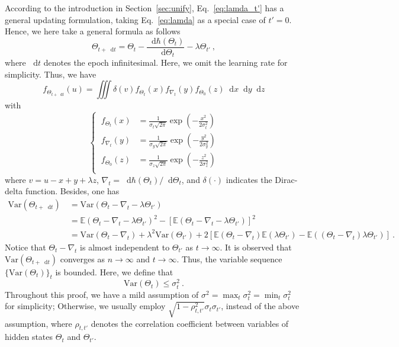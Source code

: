 \documentclass[review,10pt]{JMtemplate}
\newcommand*{\dif}{\mathop{}\!\mathrm{d}}
\begin{document}
According to the introduction in Section~\ref{sec:unify}, Eq.~\eqref{eq:lamda_t'} has a general updating formulation, taking Eq.~\eqref{eq:lamda} as a special case of $t'=0$. Hence, we here take a general formula as follows
\[
\Theta_{t+ \dif t} = \Theta_t  -  \frac{\dif \hbar(\Theta_t)}{\dif \Theta_t}  - \lambda \Theta_{t'} \ ,
\]
where $\dif t$ denotes the epoch infinitesimal. Here, we omit the learning rate for simplicity. Thus, we have
\[
f_{\Theta_{t+\dif t}}( u )  = \iiint \delta(  v  ) f_{\Theta_t}(x) f_{\nabla_t}(y)  f_{\Theta_0} (z) \dif x\! \dif y\! \dif z 
\]
with
\[
\left\{~ \begin{aligned}
    f_{\Theta_t}(x) &= \frac{1}{\sigma_t \sqrt{2\pi}} \exp \left( -\frac{x^2}{2\sigma_t^2} \right)   \\
    f_{\nabla_t}(y) &= \frac{1}{\sigma_y \sqrt{2\pi}} \exp \left( -\frac{y^2}{2\sigma_y^2} \right)  \\
    f_{\Theta_0} (z) &=  \frac{1}{\sigma_z \sqrt{2\pi}} \exp \left( -\frac{z^2}{2 \sigma_z^2} \right) \\
\end{aligned}\right.
\]
where $v= u- x + y  + \lambda z $, $\nabla_t = {\dif \hbar(\Theta_t)}/{\dif \Theta_t}$, and $\delta(\cdot)$ indicates the Dirac-delta function. Besides, one has
\[
\begin{aligned}
\mathrm{Var} \left( \Theta_{t+ \dif t} \right) &~=  \textrm{Var} \left( \Theta_t  -  \nabla_t - \lambda \Theta_{t'}   \right)  \\
&~= \mathbb{E} \left( \Theta_t  -  \nabla_t - \lambda \Theta_{t'}  \right)^2 - \left[ \mathbb{E} \left( \Theta_t  -  \nabla_t - \lambda \Theta_{t'}  \right) \right] ^2 \\
&~= \textrm{Var} \left( \Theta_t  -  \nabla_t \right) + \lambda^2 \textrm{Var} \left(  \Theta_{t'}  \right)  + 2 \left[  \mathbb{E} \left( \Theta_t  -  \nabla_t \right) \mathbb{E} \left( \lambda \Theta_{t'} \right) - \mathbb{E} \left( (\Theta_t  -  \nabla_t ) \lambda \Theta_{t'}  \right)  \right] \ .
\end{aligned}
\]
Notice that $\Theta_t  -  \nabla_t$ is almost independent to $\Theta_{t'}$ as $t \to \infty$. It is observed that $\mathrm{Var} ( \Theta_{t+ \dif t} ) $ converges as $n \to \infty$ and $t \to \infty$. Thus, the variable sequence $\{ \mathrm{Var}(\Theta_t) \}_t$ is bounded. Here, we define that 
\[
\mathrm{Var} ( \Theta_{t} ) \leq \sigma_t^2 \ .
\]
Throughout this proof, we have a mild assumption of $\sigma^2 = \max_t \sigma_t^2 = \min_t \sigma_t^2$ for simplicity; Otherwise, we usually employ $\sqrt{1 - \rho_{t,t'}^2} \sigma_t \sigma_{t'}$, instead of the above assumption, where $\rho_{t,t'}$ denotes the correlation coefficient between variables of hidden states $\Theta_t$ and $\Theta_{t'}$. 
\end{document}
